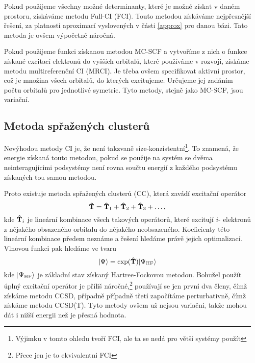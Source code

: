 Pokud použijeme všechny možné determinanty, které je možné získat v daném prostoru, 
získáváme metodu Full-CI (FCI). Touto metodou získáváme nejpřesnější řešení, za 
platnosti aproximací vyslovených v části \ref{approx} pro danou bázi. Tato metoda je 
ovšem výpočetně náročná.

Pokud použijeme funkci získanou metodou MC-SCF a vytvoříme z nich o funkce získané 
excitací elektronů do vyšších orbitalů, které používáme v rozvoji, získáme metodu
multireferenční CI (MRCI). Je třeba ovšem specifikovat aktivní prostor, což je množina
všech orbitalů, do kterých excitujeme. Určujeme jej zadáním počtu orbitalů pro 
jednotlivé symetrie. Tyto metody, stejně jako MC-SCF, jsou variační.

\subsection{Metoda spřažených clusterů}
Nevýhodou metody CI je, že není takzvaně size-konzistentní\footnote{Výjimku v tomto 
ohledu tvoří FCI, ale ta se nedá pro větší systémy použít}. To znamená, že energie 
získaná touto metodou, pokud se použije na systém se dvěma neinteragujícími podsystémy 
není rovna součtu energií z každého podsystému získaných tou samou metodou. 

Proto existuje metoda spřažených clusterů (CC), která zavádí excitační operátor
\begin{equation}
\mathbf{\hat{T}} = \mathbf{\hat{T}}_1 + \mathbf{\hat{T}}_2 + \mathbf{\hat{T}}_3 + \dots,
\end{equation}
kde $\mathbf{\hat{T}}_i$ je lineární kombinace všech takových operátorů, které excitují $i$-
elektronů z nějakého obsazeného orbitalu do nějakého neobsazeného.
Koeficienty této lineární kombinace předem neznáme a řešení hledáme právě
jejich optimalizací.
Vlnovou funkci pak hledáme ve tvaru
\begin{equation}
| \Psi \rangle = \exp(\mathbf{\hat{T}}) | \Psi_\mathrm{HF} \rangle
\end{equation}
kde $| \Psi_\mathrm{HF} \rangle$ je základní stav získaný Hartree-Fockovou metodou.
Bohužel použít úplný excitační operátor je příliš náročné,\footnote{Přece jen je to 
ekvivalentní FCI} používají se jen první dva členy, čímž získáme metodu CCSD, případně 
případně třetí započítáme perturbativně, čímž získáme metodu CCSD(T). 
Tyto metody ovšem už nejsou variační, takže mohou dát i nižší energii než je přesná hodnota. 

